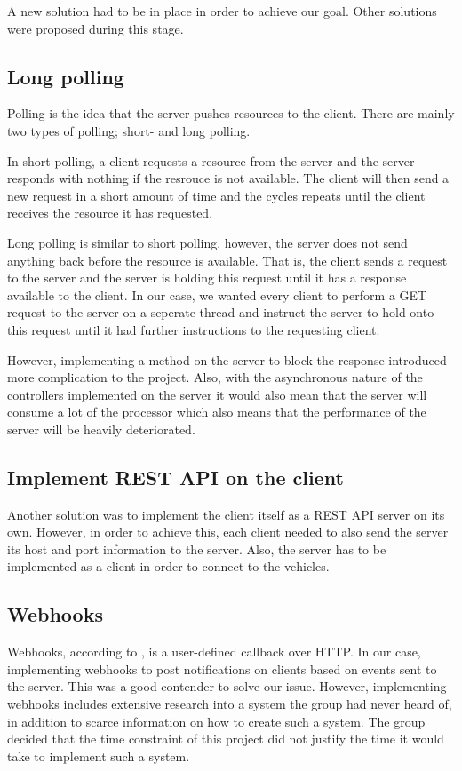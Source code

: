 A new solution had to be in place in order to achieve our goal. Other solutions were proposed during this stage.

\subsection{Long polling}
Polling is the idea that the server pushes resources to the client. There are mainly two types of polling; short- and long polling. 

In short polling, a client requests a resource from the server and the server responds with nothing if the resrouce is not available. The client will then send a new request in a short amount of time and the cycles repeats until the client receives the resource it has requested.

Long polling is similar to short polling, however, the server does not send anything back before the resource is available. That is, the client sends a request to the server and the server is holding this request until it has a response available to the client. In our case, we wanted every client to perform a GET request to the server on a seperate thread and instruct the server to hold onto this request until it had further instructions to the requesting client.

However, implementing a method on the server to block the response introduced more complication to the project. Also, with the asynchronous nature of the controllers implemented on the server it would also mean that the server will consume a lot of the processor which also means that the performance of the server will be heavily deteriorated.

\subsection{Implement REST API on the client}
Another solution was to implement the client itself as a REST API server on its own. However, in order to achieve this, each client needed to also send the server its host and port information to the server. Also, the server has to be implemented as a client in order to connect to the vehicles.

\subsection{Webhooks}
Webhooks, according to \cite{webhooks}, is a user-defined callback over HTTP. In our case, implementing webhooks to post notifications on clients based on events sent to the server. This was a good contender to solve our issue. However, implementing webhooks includes extensive research into a system the group had never heard of, in addition to scarce information on how to create such a system. The group decided that the time constraint of this project did not justify the time it would take to implement such a system.
